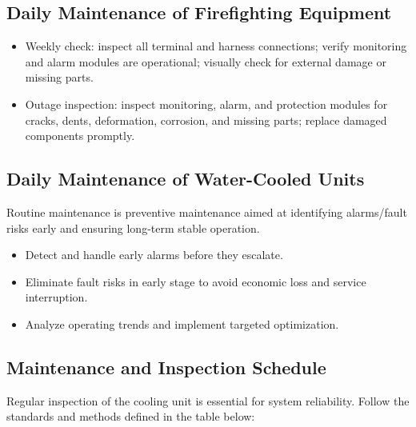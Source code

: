 \documentclass[11pt, a4paper]{article}
\begin{document}
\subsection{Daily Maintenance of Firefighting Equipment}
\begin{itemize}[leftmargin=1.5em]
    \item Weekly check: inspect all terminal and harness connections; verify monitoring and alarm modules are operational; visually check for external damage or missing parts.
    \item Outage inspection: inspect monitoring, alarm, and protection modules for cracks, dents, deformation, corrosion, and missing parts; replace damaged components promptly.
\end{itemize}

\subsection{Daily Maintenance of Water-Cooled Units}
Routine maintenance is preventive maintenance aimed at identifying alarms/fault risks early and ensuring long-term stable operation.
\begin{itemize}[leftmargin=1.5em]
    \item Detect and handle early alarms before they escalate.
    \item Eliminate fault risks in early stage to avoid economic loss and service interruption.
    \item Analyze operating trends and implement targeted optimization.
\end{itemize}

\subsection{Maintenance and Inspection Schedule}
Regular inspection of the cooling unit is essential for system reliability. Follow the standards and methods defined in the table below:
\end{document}
